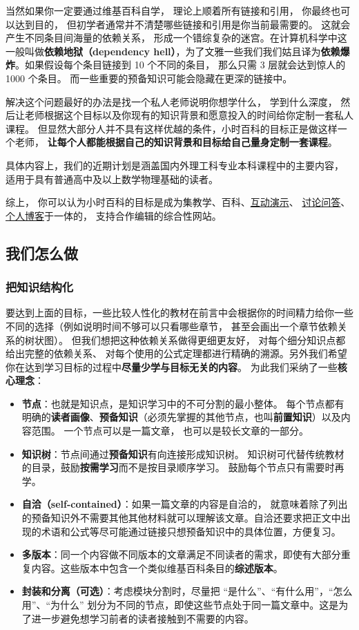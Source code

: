 当然如果你一定要通过维基百科自学， 理论上顺着所有链接和引用， 你最终也可以达到目的， 但初学者通常并不清楚哪些链接和引用是你当前最需要的。 这就会产生不同条目间海量的依赖关系， 形成一个错综复杂的迷宫。在计算机科学中这一般叫做\textbf{依赖地狱（dependency hell）}，为了文雅一些我们我们姑且译为\textbf{依赖爆炸}。如果假设每个条目链接到 10 个不同的条目， 那么只需 3 层就会达到惊人的 1000 个条目。 而一些重要的预备知识可能会隐藏在更深的链接中。

解决这个问题最好的办法是找一个私人老师说明你想学什么， 学到什么深度， 然后让老师根据这个目标以及你现有的知识背景和愿意投入的时间给你定制一套私人课程。 但显然大部分人并不具有这样优越的条件，小时百科的目标正是做这样一个老师， \textbf{让每个人都能根据自己的知识背景和目标给自己量身定制一套课程}。

具体内容上，我们的近期计划是涵盖国内外理工科专业本科课程中的主要内容， 适用于具有普通高中及以上数学物理基础的读者。

综上， 你可以认为小时百科的目标是成为集教学、百科、\href{http://wuli.wiki/apps}{互动演示}、 \href{http://wuli.wiki/forum}{讨论问答}、 \href{http://wuli.wiki/note}{个人博客}于一体的， 支持合作编辑的综合性网站。

\subsection{我们怎么做}

\subsubsection{把知识结构化}
要达到上面的目标，一些比较人性化的教材在前言中会根据你的时间精力给你一些不同的选择（例如说明时间不够可以只看哪些章节， 甚至会画出一个章节依赖关系的树状图）。 但我们想把这种依赖关系做得更细更友好， 对每个细分知识点都给出完整的依赖关系、 对每个使用的公式定理都进行精确的溯源。另外我们希望你在达到学习目标的过程中\textbf{尽量少学与目标无关的内容}。 为此我们采纳了一些\textbf{核心理念}：
\begin{itemize}
\item \textbf{节点}：也就是知识点，是知识学习中的不可分割的最小整体。 每个节点都有明确的\textbf{读者画像}、\textbf{预备知识}（必须先掌握的其他节点，也叫\textbf{前置知识}）以及内容范围。 一个节点可以是一篇文章， 也可以是较长文章的一部分。
\item \textbf{知识树}：节点间通过\textbf{预备知识}有向连接形成知识树。 知识树可代替传统教材的目录，鼓励\textbf{按需学习}而不是按目录顺序学习。 鼓励每个节点只有需要时再学。
\item \textbf{自洽（self-contained）}：如果一篇文章的内容是自洽的， 就意味着除了列出的预备知识外不需要其他其他材料就可以理解该文章。自洽还要求把正文中出现的术语和公式等尽可能通过链接只想预备知识中的具体位置，方便复习。
\item \textbf{多版本}：同一个内容做不同版本的文章满足不同读者的需求，即使有大部分重复内容。这些版本中包含一个类似维基百科条目的\textbf{综述版本}。
\item \textbf{封装和分离（可选）}：考虑模块分割时，尽量把 “是什么”、“有什么用”，“怎么用”、“为什么” 划分为不同的节点，即使这些节点处于同一篇文章中。这是为了进一步避免想学习前者的读者接触到不需要的内容。
\end{itemize}

